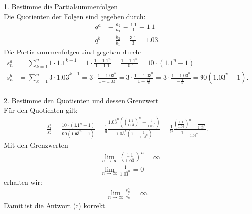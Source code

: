 \underline{1. Bestimme die Partialsummenfolgen}\\
Die Quotienten der Folgen sind gegeben durch:
\begin{align*}
	q^a &= \frac{a_2}{a_1} = \frac{1.1}{1} = 1.1\\
	q^b &= \frac{b_2}{b_1} = \frac{3.1}{3} = 1.0\overline{3}.
\end{align*}
Die Partialsummenfolgen sind gegeben durch:
\begin{align*}
	s_n^a
	&=
	\sum \limits_{k=1}^n 1 \cdot 1.1^{k-1}
	=
	1 \cdot 
	\frac{1 -1.1^n}{1 - 1.1}
	= 
	\frac{1 - 1.1^n}{-0.1}
	=
	10 \cdot( 1.1^n - 1)\\
	s_n^b
	&=
	\sum \limits_{k=1}^n 3 \cdot 1.0\overline{3}^{k-1}
	=
	3 \cdot 
	\frac{1 -1.0\overline{3}^n}{1 - 1.0\overline{3}}
	= 
		3 \cdot 
	\frac{1 - 1.0\overline{3}^n}{1 - \frac{31}{30}}
	=
	3 \cdot 
	\frac{1 - 1.0\overline{3}^n}{- \frac{1}{30}}
	=
	90 (1.0\overline{3}^n -1).
\end{align*}
\ \\
\underline{2. Bestimme den Quotienten und dessen Grenzwert}\\
Für den Quotienten gilt:
\begin{align*}
	\frac{s_n^a}{s_n^b}
	=
	\frac{10 \cdot( 1.1^n - 1)}{90 (1.0\overline{3}^n -1)}
	=
	\frac{1}{9}
		\frac{
			1.0\overline{3}^n 
			\left(
			\left(
				\frac{1.1}{1.0\overline{3}}
				\right)^n 
				- \frac{1}{1.0\overline{3}^n}
			\right)
		}
		{
			1.0\overline{3}^n 
				\left(
					1 - 	\frac{1}{1.0\overline{3}^n}
				\right)		
		}
	=
	\frac{1}{9}
	\frac{	
		\left(
		\frac{1.1}{1.0\overline{3}}
		\right)^n 
		- \frac{1}{1.0\overline{3}^n}
	}
	{
		1 - 	\frac{1}{1.0\overline{3}^n}	
	}.
\end{align*}
Mit den Grenzwerten
\begin{align*}
	&\lim 
	\limits_{n \to \infty}
	\left(\frac{1.1}{1.0\overline{3}}\right)^n = \infty\\
	&\lim 
	\limits_{n \to \infty}
	\frac{1}{1.0\overline{3}^n} = 0
\end{align*}
erhalten wir:
\begin{align*}
	\lim 
	\limits_{n \to \infty}
	\frac{s_n^a}{s_n^b} = \infty.
\end{align*}
Damit ist die Antwort (c) korrekt.

\newpage
